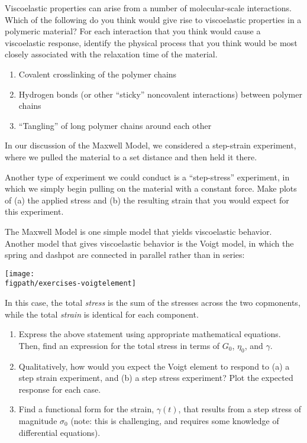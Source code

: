 \begin{activity}
\begin{ctqs}
\end{ctqs}
	

\begin{exercises}

		\exercise Viscoelastic properties can arise from a number of molecular-scale interactions.  Which of the following do you think would give rise to viscoelastic properties in a polymeric material?  For each interaction that you think would cause a viscoelastic response, identify the physical process that you think would be most closely associated with the relaxation time of the material.
		
			\begin{enumerate}
				\item Covalent crosslinking of the polymer chains
				\item Hydrogen bonds (or other ``sticky'' noncovalent interactions) between polymer chains
				\item ``Tangling'' of long polymer chains around each other
			\end{enumerate}
			
		
		\exercise In our discussion of the Maxwell Model, we considered a step-strain experiment, where we pulled the material to a set distance and then held it there.
		
			Another type of experiment we could conduct is a ``step-stress'' experiment, in which we simply begin pulling on the material with a constant force.  Make plots of (a) the applied stress and (b) the resulting strain that you would expect for this experiment.
		
		\exercise The Maxwell Model is one simple model that yields viscoelastic behavior.  Another model that gives viscoelastic behavior is the Voigt model, in which the spring and dashpot are connected in parallel rather than in series:
		
			\centerline{\texttt{[image: \\figpath/exercises-voigtelement]}}
			
			In this case, the total \emph{stress} is the sum of the stresses across the two copmonents, while the total \emph{strain} is identical for each component.
			
			\begin{enumerate}
				\item Express the above statement using appropriate mathematical equations.  Then, find an expression for the total stress in terms of $G_0$, $\eta_0$, and $\gamma$.
				\item Qualitatively, how would you expect the Voigt element to respond to (a) a step strain experiment, and (b) a step stress experiment?  Plot the expected response for each case.
				\item Find a functional form for the strain, $\gamma(t)$, that results from a step stress of magnitude $\sigma_0$ (note: this is challenging, and requires some knowledge of differential equations).
			\end{enumerate}
		

\end{exercises}
\end{activity}
